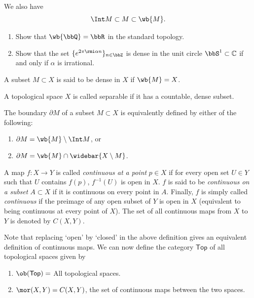 We also have
\begin{equation}
    \Int M \subset M \subset \wb{M}.
\end{equation}

\begin{xca}
\begin{enumerate}
    \item Show that $\wb{\bbQ}=\bbR $ in the standard topology.
    \item Show that the set $\{e^{2\pi\rmi \alpha n}\}_{n\in\bbZ}$ is dense in the unit circle $\bbS^1\subset \mathbb{C}$ if and only if $\alpha$ is irrational.
\end{enumerate}
\end{xca}

\begin{defn}
    A subset $M\subset X$ is said to be dense in $X$ if $\wb{M} = X$.
\end{defn}

\begin{defn}
    A topological space $X$ is called separable if it has a countable, dense subset.
\end{defn}

\begin{defn}[Boundary]
    The boundary $\partial M$ of a subset $M\subset X$ is equivalently defined by either of the following:
    \begin{enumerate}
        \item $\partial M = \wb{M} \setminus \Int M$, or
        \item $\partial M = \wb{M} \cap \widebar{X\setminus M}$.
    \end{enumerate}
\end{defn}

\begin{defn}
    A map $f:X\rightarrow Y$ is called \emph{continuous at a point} $p\in X$ if for every open set $U\in Y$ such that $U$ contains $f(p)$, $f^{-1}(U)$ is open in $X$. $f$ is said to be \emph{continuous on a subset} $A\subset X$ if it is continuous on every point in $A$. Finally, $f$ is simply called \emph{continuous} if the preimage of any open subset of $Y$ is open in $X$ (equivalent to being continuous at every point of $X$). The set of all continuous maps from $X$ to $Y$ is denoted by $C(X,Y)$.
\end{defn}

Note that replacing `open' by `closed' in the above definition gives an equivalent definition of continuous maps.  We can now define the category $\mathsf{Top}$ of all topological spaces given by
\begin{enumerate}
    \item $\ob(\mathsf{Top})=$ All topological spaces.
    \item $\mor(X,Y) = C(X,Y)$, the set of continuous maps between the two spaces.
\end{enumerate}

